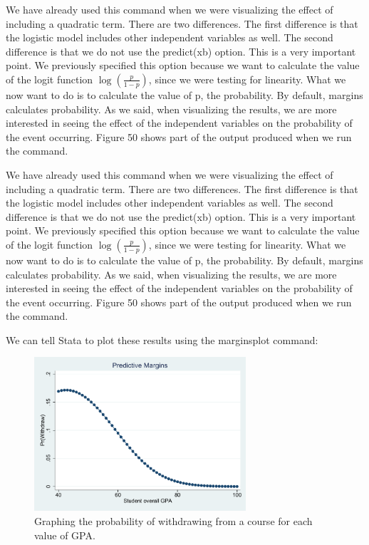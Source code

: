 \documentclass[a4paper,12pt,oneside]{book}
\begin{document}
\begin{stlog}\end{stlog}

We have already used this command when we were visualizing the effect of including a quadratic term. There are two differences. The first difference is that the logistic model includes other independent variables as well. 
The second difference is that we do not use the predict(xb) option. This is a very important point. We previously specified this option because we want to calculate the value of the logit function $\log(\frac{p}{1-p})$, 
since we were testing for linearity. What we now want to do is to calculate the value of p, the probability. By default, margins calculates probability. As we said, when visualizing the results, we are more 
interested in seeing the effect of the independent variables on the probability of the event occurring. Figure 50 shows part of the output produced when we run the command.

We have already used this command when we were visualizing the effect of including a quadratic term. There are two differences. The first difference is that the logistic model includes other independent variables as 
well. The second difference is that we do not use the predict(xb) option. This is a very important point. We previously specified this option because we want to calculate the value 
of the logit function $\log(\frac{p}{1-p})$, since we were testing for linearity. What we now want to do is to calculate the value of p, the probability. By default, margins calculates 
probability. As we said, when visualizing the results, we are more interested in seeing the effect of the independent variables on the probability of the event occurring. 
Figure 50 shows part of the output produced when we run the command.

We can tell Stata to plot these results using the marginsplot command:

\begin{stlog}\end{stlog}
\begin{figure}[h]
    \centering
    \includegraphics[width=0.7\textwidth]{book_63.pdf}
    \caption{Graphing the probability of withdrawing from a course for each value of GPA.}
    \label{fig:visual1}
\end{figure}
\end{document}
